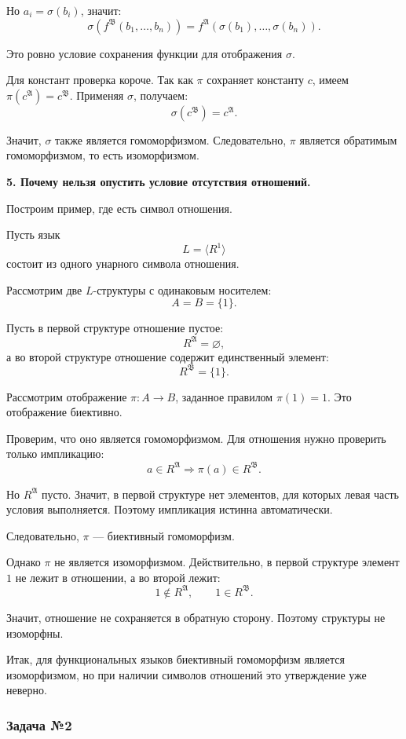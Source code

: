 \documentclass[12pt,a4paper,oneside,openany]{book}
\theoremstyle{definition}
\theoremstyle{plain}
\theoremstyle{remark}
\begin{document}
Но $a_i=\sigma(b_i)$, значит:
\[
\sigma(f^{\mathfrak B}(b_1,\dots,b_n))
=
f^{\mathfrak A}(\sigma(b_1),\dots,\sigma(b_n)).
\]

Это ровно условие сохранения функции для отображения $\sigma$.

Для констант проверка короче. Так как $\pi$ сохраняет константу $c$, имеем $\pi(c^{\mathfrak A})=c^{\mathfrak B}$. Применяя $\sigma$, получаем:
\[
\sigma(c^{\mathfrak B})=c^{\mathfrak A}.
\]

Значит, $\sigma$ также является гомоморфизмом. Следовательно, $\pi$ является обратимым гомоморфизмом, то есть изоморфизмом.

\textbf{5. Почему нельзя опустить условие отсутствия отношений.}

Построим пример, где есть символ отношения.

Пусть язык
\[
L=\langle R^1\rangle
\]
состоит из одного унарного символа отношения.

Рассмотрим две $L$-структуры с одинаковым носителем:
\[
A=B=\{1\}.
\]

Пусть в первой структуре отношение пустое:
\[
R^{\mathfrak A}=\varnothing,
\]
а во второй структуре отношение содержит единственный элемент:
\[
R^{\mathfrak B}=\{1\}.
\]

Рассмотрим отображение $\pi:A\to B$, заданное правилом $\pi(1)=1$. Это отображение биективно.

Проверим, что оно является гомоморфизмом. Для отношения нужно проверить только импликацию:
\[
a\in R^{\mathfrak A}
\Rightarrow
\pi(a)\in R^{\mathfrak B}.
\]

Но $R^{\mathfrak A}$ пусто. Значит, в первой структуре нет элементов, для которых левая часть условия выполняется. Поэтому импликация истинна автоматически.

Следовательно, $\pi$ — биективный гомоморфизм.

Однако $\pi$ не является изоморфизмом. Действительно, в первой структуре элемент $1$ не лежит в отношении, а во второй лежит:
\[
1\notin R^{\mathfrak A},
\qquad
1\in R^{\mathfrak B}.
\]

Значит, отношение не сохраняется в обратную сторону. Поэтому структуры не изоморфны.

Итак, для функциональных языков биективный гомоморфизм является изоморфизмом, но при наличии символов отношений это утверждение уже неверно.


\subsubsection*{Задача №2}
\end{document}
